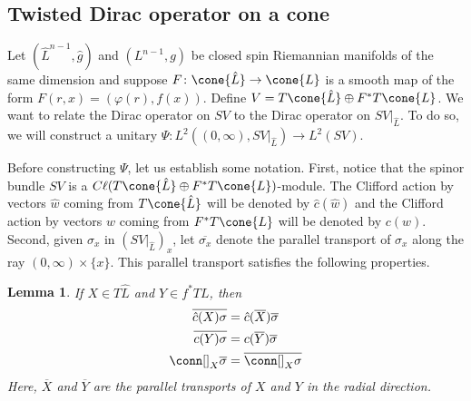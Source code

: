 \documentclass[12pt, reqno]{amsart}
\theoremstyle{plain} %
\newtheorem{lemma}[theorem]{Lemma}
\theoremstyle{definition}
\theoremstyle{remark}
\numberwithin{equation}{section}
\newcommand{\dom}[1]{\hat{#1}}
\newcommand{\Cl}{C\ell}
\newcommand{\tdim}{n} %
\begin{document}
\subsection{Twisted Dirac operator on a cone}\label{subsec:twisted dirac operator on cone}
Let \((\dom{L}^{\tdim-1}, \dom{g})\) and \((L^{\tdim-1}, g)\) be closed spin Riemannian manifolds of the same dimension and suppose \(F \colon \cone{\dom{L}} \to \cone{L}\) is a smooth map of the form \(F(r,x) = (\varphi(r), f(x))\). Define \(V = T\cone{\dom{L}} \oplus F^*T\cone{L}\). We want to relate the Dirac operator on \(SV\) to the Dirac operator on \(SV|_{\dom{L}}\). To do so, we will construct a unitary \(\Psi \colon L^2((0, \infty), SV|_{\dom{L}}) \to L^2(SV)\).

Before constructing \(\Psi\), let us establish some notation.
First, notice that the spinor bundle \(SV\) is a \(\Cl(T\cone{\dom{L}} \oplus F^*T\cone{L})\)-module.
The Clifford action by vectors \(\dom{w}\) coming from \(T\cone{\dom{L}}\) will be denoted by \(\dom{c}(\dom{w})\) and the Clifford action by vectors \(w\) coming from \(F^*T\cone{L}\) will be denoted by \(c(w)\). Second, given \(\sigma_x\) in \((SV|_{\dom{L}})_x\), let \(\overline{\sigma_x}\) denote the parallel transport of \(\sigma_x\) along the ray \((0, \infty) \times \{x\}\).
This parallel transport satisfies the following properties.
\begin{lemma}
    If \(X \in T\dom{L}\) and \(Y \in f^*TL\), then
    \begin{gather}
        \label{eqn:clifford action pulls out of parallel transport - vector from domain} \overline{\dom{c}(X) \sigma} = \dom{c}(\overline{X}) \overline{\sigma} \\
        \label{eqn:clifford action pulls out of parallel transport - vector from target} \overline{c(Y) \sigma} = c(\overline{Y}) \overline{\sigma} \\
        \label{eqn:derivative of parallel transport} \conn[]_X \overline{\sigma} = \overline{\conn[]_X \sigma}
    \end{gather}
    Here, \(\overline{X}\) and \(\overline{Y}\) are the parallel transports of \(X\) and \(Y\) in the radial direction.
\end{lemma}
\end{document}
